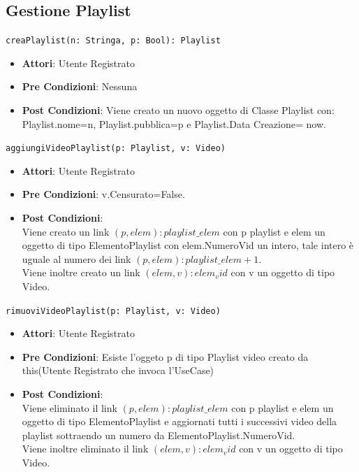\documentclass[12pt, letterpaper]{article}
\newcommand{\code}[1]{\colorbox{light-gray}{\texttt{#1}}}
\begin{document}
\subsection{Gestione Playlist}
\code{creaPlaylist(n: Stringa, p: Bool): Playlist}
\begin{itemize}
    \item \textbf{Attori}: Utente Registrato
    \item \textbf{Pre Condizioni}: Nessuna
    \item \textbf{Post Condizioni}: Viene creato un nuovo oggetto di Classe Playlist con: Playlist.nome=n, Playlist.pubblica=p e Playlist.Data Creazione= now.
\end{itemize}
\code{aggiungiVideoPlaylist(p: Playlist, v: Video)}
\begin{itemize}
    \item \textbf{Attori}: Utente Registrato
    \item \textbf{Pre Condizioni}: v.Censurato=False.
    \item \textbf{Post Condizioni}: \\Viene creato un link $(p, elem): playlist\_elem$ con p playlist e elem un oggetto di tipo ElementoPlaylist con elem.NumeroVid un intero, tale intero è uguale al numero dei link $(p, elem): playlist\_elem +1$.
    \\Viene inoltre creato un link $(elem,v): elem_vid$ con v un oggetto di tipo Video.
\end{itemize}
\code{rimuoviVideoPlaylist(p: Playlist, v: Video)}
\begin{itemize}
    \item \textbf{Attori}: Utente Registrato
    \item \textbf{Pre Condizioni}: Esiste l'oggeto p di tipo Playlist video creato da this(Utente Registrato che invoca l'UseCase)
    \item \textbf{Post Condizioni}: \\
    Viene eliminato il link $(p, elem): playlist\_elem$ con p playlist e elem un oggetto di tipo ElementoPlaylist e aggiornati tutti i successivi video della playlist sottraendo un numero da ElementoPlaylist.NumeroVid.
    \\Viene inoltre eliminato il link $(elem,v): elem_vid$ con v un oggetto di tipo Video.
\end{itemize}
\end{document}
